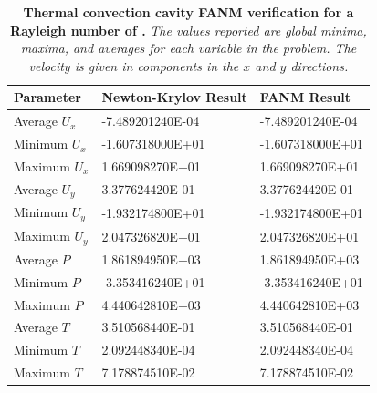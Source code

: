 \begin{table}[h!]
  \begin{center}
    \begin{tabular}{lll}\hline\hline
      \multicolumn{1}{l}{Parameter}& 
      \multicolumn{1}{l}{Newton-Krylov Result}&
      \multicolumn{1}{l}{FANM Result}\\
      \hline
      Average $U_x$ & -7.489201240E-04 & -7.489201240E-04 \\
      Minimum $U_x$ & -1.607318000E+01 & -1.607318000E+01 \\
      Maximum $U_x$ & 1.669098270E+01 & 1.669098270E+01 \\
      \hline
      Average $U_y$ & 3.377624420E-01 & 3.377624420E-01 \\
      Minimum $U_y$ & -1.932174800E+01 & -1.932174800E+01 \\
      Maximum $U_y$ & 2.047326820E+01 & 2.047326820E+01 \\
      \hline
      Average $P$ & 1.861894950E+03 & 1.861894950E+03 \\
      Minimum $P$ & -3.353416240E+01 & -3.353416240E+01 \\
      Maximum $P$ & 4.440642810E+03 & 4.440642810E+03 \\
      \hline
      Average $T$ & 3.510568440E-01 & 3.510568440E-01 \\
      Minimum $T$ & 2.092448340E-04 & 2.092448340E-04 \\
      Maximum $T$ & 7.178874510E-02 & 7.178874510E-02 \\
      \hline\hline
    \end{tabular}
  \end{center}
  \caption{\textbf{Thermal convection cavity FANM verification for a
      Rayleigh number of .} \textit{The values reported are
      global minima, maxima, and averages for each variable in the
      problem. The velocity is given in components in the $x$ and $y$
      directions.}}
  \label{tab:convection_ra1e4_results}
\end{table}

